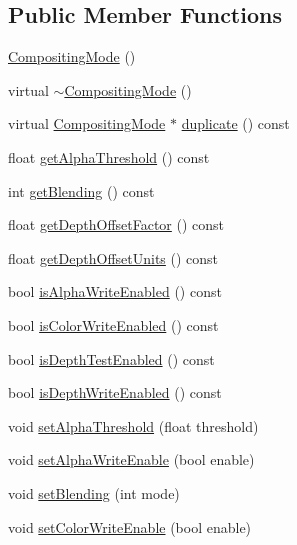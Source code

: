 \subsection*{Public Member Functions}
\begin{CompactItemize}
\item 
\hyperlink{classm3g_1_1CompositingMode_5abfd1a798f1327aac4b92f55d4ecc0c}{CompositingMode} ()
\item 
virtual \hyperlink{classm3g_1_1CompositingMode_0bba5b15be7249e946c9aaf94631ce3b}{$\sim$CompositingMode} ()
\item 
virtual \hyperlink{classm3g_1_1CompositingMode}{CompositingMode} $\ast$ \hyperlink{classm3g_1_1CompositingMode_ab6fcd945b68728bbe2c65a8f45dc8dd}{duplicate} () const 
\item 
float \hyperlink{classm3g_1_1CompositingMode_19ab71363ea77fa86aa6fafce87f06cb}{getAlphaThreshold} () const 
\item 
int \hyperlink{classm3g_1_1CompositingMode_078954de3d786bd11dc98b06f237bbbb}{getBlending} () const 
\item 
float \hyperlink{classm3g_1_1CompositingMode_d24a4116e72678164f31d7a48f74be6b}{getDepthOffsetFactor} () const 
\item 
float \hyperlink{classm3g_1_1CompositingMode_add4c6c3bc01c1d0689e0588af79039f}{getDepthOffsetUnits} () const 
\item 
bool \hyperlink{classm3g_1_1CompositingMode_bfcec134f769763d492011fc8ccadcce}{isAlphaWriteEnabled} () const 
\item 
bool \hyperlink{classm3g_1_1CompositingMode_35ffa21944393c774552003dd2cb03ea}{isColorWriteEnabled} () const 
\item 
bool \hyperlink{classm3g_1_1CompositingMode_4dd97b29a6e12c5e64477ab1546f93f1}{isDepthTestEnabled} () const 
\item 
bool \hyperlink{classm3g_1_1CompositingMode_0ee4c812abd4a99e0373158d36dc45d9}{isDepthWriteEnabled} () const 
\item 
void \hyperlink{classm3g_1_1CompositingMode_6becafaefd18a2b8b1adeba491576837}{setAlphaThreshold} (float threshold)
\item 
void \hyperlink{classm3g_1_1CompositingMode_5204f1acac056f82d322262703be67b0}{setAlphaWriteEnable} (bool enable)
\item 
void \hyperlink{classm3g_1_1CompositingMode_4c09465dfec9efa000c115c5c2867b63}{setBlending} (int mode)
\item 
void \hyperlink{classm3g_1_1CompositingMode_84f7cba08f5a2bea05de4fc3154a50b2}{setColorWriteEnable} (bool enable)

\end{CompactItemize}
